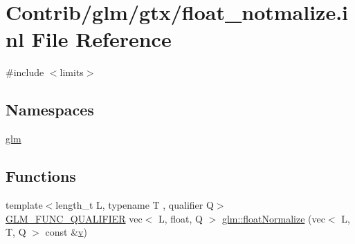 \hypertarget{float__notmalize_8inl}{}\section{Contrib/glm/gtx/float\+\_\+notmalize.inl File Reference}
\label{float__notmalize_8inl}
{\ttfamily \#include $<$limits$>$}\newline
\subsection*{Namespaces}
\begin{DoxyCompactItemize}
\item 
 \mbox{\hyperlink{namespaceglm}{glm}}
\end{DoxyCompactItemize}
\subsection*{Functions}
\begin{DoxyCompactItemize}
\item 
{\footnotesize template$<$length\+\_\+t L, typename T , qualifier Q$>$ }\\\mbox{\hyperlink{setup_8hpp_a33fdea6f91c5f834105f7415e2a64407}{G\+L\+M\+\_\+\+F\+U\+N\+C\+\_\+\+Q\+U\+A\+L\+I\+F\+I\+ER}} vec$<$ L, float, Q $>$ \mbox{\hyperlink{namespaceglm_abe353196ef510a000c1c6b74d27db1e1}{glm\+::float\+Normalize}} (vec$<$ L, T, Q $>$ const \&\mbox{\hyperlink{_s_d_l__opengl_8h_a10a82eabcb59d2fcd74acee063775f90}{v}})
\end{DoxyCompactItemize}

